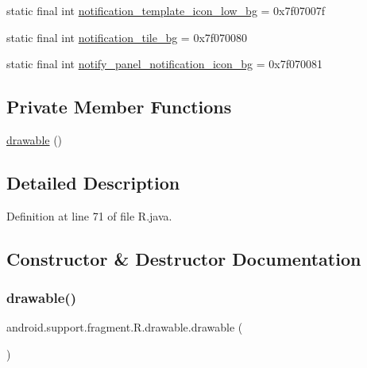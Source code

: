 \begin{DoxyCompactItemize}
\item 
static final int \mbox{\hyperlink{classandroid_1_1support_1_1fragment_1_1_r_1_1drawable_a66725999702b63cc02f2470d96c99744}{notification\+\_\+template\+\_\+icon\+\_\+low\+\_\+bg}} = 0x7f07007f
\item 
static final int \mbox{\hyperlink{classandroid_1_1support_1_1fragment_1_1_r_1_1drawable_a424a9574524ba829feba39ffb0d5f208}{notification\+\_\+tile\+\_\+bg}} = 0x7f070080
\item 
static final int \mbox{\hyperlink{classandroid_1_1support_1_1fragment_1_1_r_1_1drawable_a5972fbc11817ad2e0cbb34f744075a95}{notify\+\_\+panel\+\_\+notification\+\_\+icon\+\_\+bg}} = 0x7f070081
\end{DoxyCompactItemize}
\subsection*{Private Member Functions}
\begin{DoxyCompactItemize}
\item 
\mbox{\hyperlink{classandroid_1_1support_1_1fragment_1_1_r_1_1drawable_ae1a38b5dbb89e8d567d465815a8b184d}{drawable}} ()
\end{DoxyCompactItemize}


\subsection{Detailed Description}


Definition at line 71 of file R.\+java.



\subsection{Constructor \& Destructor Documentation}
\mbox{\label{classandroid_1_1support_1_1fragment_1_1_r_1_1drawable_ae1a38b5dbb89e8d567d465815a8b184d}} 
\subsubsection{\texorpdfstring{drawable()}{drawable()}}
{\footnotesize\ttfamily android.\+support.\+fragment.\+R.\+drawable.\+drawable (\begin{DoxyParamCaption}{ }\end{DoxyParamCaption})\hspace{0.3cm}{\ttfamily [private]}}



